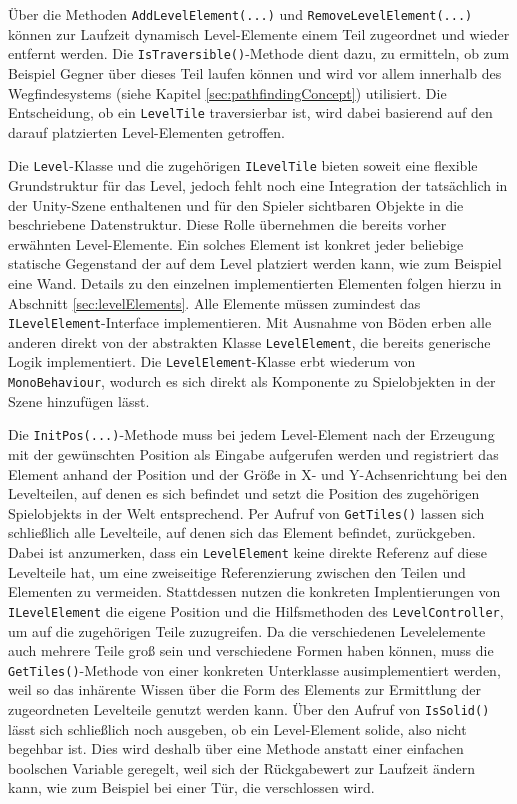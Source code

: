 Über die Methoden \texttt{AddLevelElement(...)} und \texttt{RemoveLevelElement(...)} können zur Laufzeit dynamisch Level-Elemente einem Teil zugeordnet und wieder entfernt werden. Die \texttt{Is\-Tra\-ver\-si\-ble()}-Methode dient dazu, zu ermitteln, ob zum Beispiel Gegner über dieses Teil laufen können und wird vor allem innerhalb des Wegfindesystems (siehe Kapitel \ref{sec:pathfindingConcept}) utilisiert. Die Entscheidung, ob ein \texttt{LevelTile} traversierbar ist, wird dabei basierend auf den darauf platzierten Level-Elementen getroffen.

Die \texttt{Level}-Klasse und die zugehörigen \texttt{ILevelTile} bieten soweit eine flexible Grundstruktur für das Level, jedoch fehlt noch eine Integration der tatsächlich in der Unity-Szene enthaltenen und für den Spieler sichtbaren Objekte in die beschriebene Datenstruktur. Diese Rolle übernehmen die bereits vorher erwähnten Level-Elemente. Ein solches Element ist konkret jeder beliebige statische Gegenstand der auf dem Level platziert werden kann, wie zum Beispiel eine Wand. Details zu den einzelnen implementierten Elementen folgen hierzu in Abschnitt \ref{sec:levelElements}. Alle Elemente müssen zumindest das \texttt{ILevelElement}-Interface implementieren. Mit Ausnahme von Böden erben alle anderen direkt von der abstrakten Klasse \texttt{LevelElement}, die bereits generische Logik implementiert. Die \texttt{LevelElement}-Klasse erbt wiederum von \texttt{MonoBehaviour}, wodurch es sich direkt als Komponente zu Spielobjekten in der Szene hinzufügen lässt.

Die \texttt{InitPos(...)}-Methode muss bei jedem Level-Element nach der Erzeugung mit der ge\-wünsch\-ten Position als Eingabe aufgerufen werden und registriert das Element anhand der Position und der Größe in X- und Y-Achsenrichtung bei den Levelteilen, auf denen es sich befindet und setzt die Position des zugehörigen Spielobjekts in der Welt entsprechend. Per Aufruf von \texttt{GetTiles()} lassen sich schließlich alle Levelteile, auf denen sich das Element befindet, zurückgeben. Dabei ist anzumerken, dass ein \texttt{LevelElement} keine direkte Referenz auf diese Levelteile hat, um eine zweiseitige Referenzierung zwischen den Teilen und Elementen zu vermeiden. Stattdessen nutzen die konkreten Implentierungen von \texttt{ILevelElement} die eigene Position und die Hilfsmethoden des \texttt{LevelController}, um auf die zugehörigen Teile zuzugreifen. Da die verschiedenen Levelelemente auch mehrere Teile groß sein und verschiedene Formen haben können, muss die \texttt{GetTiles()}-Methode von einer konkreten Unterklasse ausimplementiert werden, weil so das inhärente Wissen über die Form des Elements zur Ermittlung der zugeordneten Levelteile genutzt werden kann. Über den Aufruf von \texttt{IsSolid()} lässt sich schließlich noch ausgeben, ob ein Level-Element solide, also nicht begehbar ist. Dies wird deshalb über eine Methode anstatt einer einfachen boolschen Variable geregelt, weil sich der Rückgabewert zur Laufzeit ändern kann, wie zum Beispiel bei einer Tür, die verschlossen wird.

